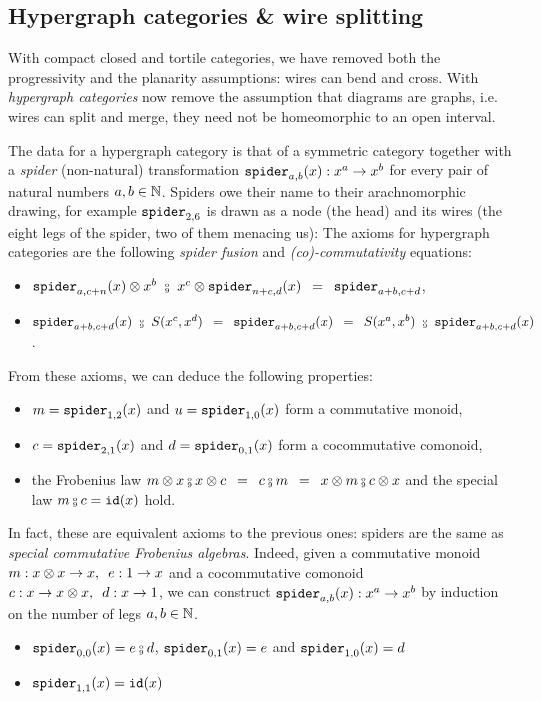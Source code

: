 
\subsection{Hypergraph categories \& wire splitting} \label{subsection:hypergraph}

With compact closed and tortile categories, we have removed both the progressivity and the planarity assumptions: wires can bend and cross.
With \emph{hypergraph categories} now remove the assumption that diagrams are graphs, i.e. wires can split and merge, they need not be homeomorphic to an open interval.

The data for a hypergraph category is that of a symmetric category together with a \emph{spider} (non-natural) transformation $\mathtt{spider}_{a, b}(x) : x^a \to x^b$ for every pair of natural numbers $a, b \in \mathbb{N}$.
Spiders owe their name to their arachnomorphic drawing, for example $\mathtt{spider}_{2, 6}$ is drawn as a node (the head) and its wires (the eight legs of the spider, two of them menacing us):
The axioms for hypergraph categories are the following \emph{spider fusion} and \emph{(co)-commutativity} equations:
\begin{itemize}
\item $\spider_{a, c + n}(x) \otimes x^b \ \fcmp \ x^c \otimes \spider_{n + c, d}(x)
\s = \s \spider_{a + b, c + d}$,
\item $\spider_{a + b, c + d}(x) \ \fcmp \ S(x^c, x^d)
\s = \s \spider_{a + b, c + d}(x) \s = \s
S(x^a, x^b) \ \fcmp \ \spider_{a + b, c + d}(x)$.
\end{itemize}
From these axioms, we can deduce the following properties:
\begin{itemize}
\item $m = \mathtt{spider}_{1, 2}(x)$ and $u = \mathtt{spider}_{1, 0}(x)$ form a commutative monoid,
\item $c = \mathtt{spider}_{2, 1}(x)$ and $d = \mathtt{spider}_{0, 1}(x)$ form a cocommutative comonoid,
\item the Frobenius law $m \otimes x \fcmp x \otimes c \s = \s c \fcmp m \s = \s x \otimes m \fcmp c \otimes x$ and the special law $m \fcmp c = \id(x)$ hold.
\end{itemize}
In fact, these are equivalent axioms to the previous ones: spiders are the same as \emph{special commutative Frobenius algebras}.
Indeed, given a commutative monoid $m : x \otimes x \to x, \enspace e : 1 \to x$ and a cocommutative comonoid $c : x \to x \otimes x, \enspace d : x \to 1$, we can construct $\mathtt{spider}_{a, b}(x) : x^a \to x^b$ by induction on the number of legs $a, b \in \mathbb{N}$.
\begin{itemize}
\item $\spider_{0, 0}(x) = e \fcmp d$, $\mathtt{spider}_{0, 1}(x) = e$ and $\mathtt{spider}_{1, 0}(x) = d$
\item $\mathtt{spider}_{1, 1}(x) = \mathtt{id}(x)$
\end{itemize}

